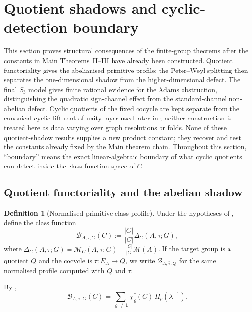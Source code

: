 \documentclass[11pt,a4paper]{amsart}
\theoremstyle{plain}
\theoremstyle{definition}
\newtheorem{definition}[theorem]{Definition}
\theoremstyle{remark}
\begin{document}
\section{Quotient shadows and cyclic-detection boundary}
\label{sec:shadows}

This section proves structural consequences of the finite-group
theorems after the constants in Main Theorems~II--III have already been
constructed.  Quotient functoriality gives the abelianised primitive
profile; the Peter--Weyl splitting then separates the one-dimensional
shadow from the higher-dimensional defect. The final \(S_3\) model gives finite rational evidence for the Adams
obstruction, distinguishing the quadratic sign-channel effect from the
standard-channel non-abelian defect. Cyclic quotients of the fixed cocycle are kept separate from the
canonical cyclic-lift root-of-unity layer used later in
; neither construction is treated here as data
varying over graph resolutions or folds. None of these quotient-shadow
results supplies a new product constant; they recover and test the
constants already fixed by the Main theorem chain.
Throughout this section, ``boundary'' means the exact linear-algebraic
boundary of what cyclic quotients can detect inside the class-function
space of \(G\).

\subsection{Quotient functoriality and the abelian shadow}

\begin{definition}[Normalised primitive class profile]
  \label{def:normalised-primitive-class-profile}
  Under the hypotheses of , define the
  class function
  \[
    \mathcal B_{A,\tau;G}(C):=\frac{|G|}{|C|}\Delta_C(A,\tau;G),
  \]
  where \(\Delta_C(A,\tau;G)=\mathcal M_C(A,\tau;G)-\frac{|C|}{|G|}\mathcal M(A)\).
  If the target group is a quotient \(Q\) and the cocycle is
  \(\bar\tau:E_A\to Q\), we write
  \(\mathcal B_{A,\bar\tau;Q}\) for the same normalised profile computed
  with \(Q\) and \(\bar\tau\).
\end{definition}

By ,
\begin{equation}\label{eq:normalised-primitive-class-profile}
  \mathcal B_{A,\tau;G}(C)
  =
  \sum_{\varrho\neq \mathbf 1}
    \chi_\varrho^\ast(C)\,\Pi_\varrho(\lambda^{-1}).
\end{equation}
\end{document}
